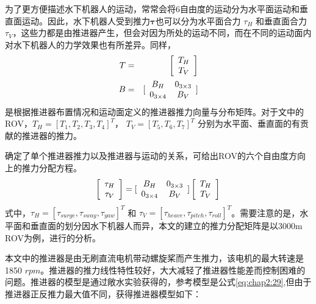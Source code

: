 为了更方便描述水下机器人的运动，常常会将6自由度的运动分为水平面运动和垂直面运动。因此，水下机器人受到推力$\bm \tau$也可以分为水平面合力 $\tau_H$ 和垂直面合力 $\tau_V$，这些力都是由推进器产生，但会对因为所处的运动不同，而在不同的运动面内对水下机器人的力学效果也有所差异。同样，\\
\begin{eqnarray}
\label{eq:chap2:BvBh}
\centering
T &=& \left[ {\begin{array}{*{20}{c}}
   {{T_H}}  \\
   {{T_V}}  \\
\end{array}} \right]\\
B &=& [\begin{array}{*{20}{c}}
    {{B_H}} & {0_{3\times3}}  \\
    {0_{3\times4}} & {{B_V}}  \\
\end{array}]
\end{eqnarray}
是根据推进器布置情况和运动面定义的推进器推力向量与分布矩阵。对于文中的ROV，$T_H = [T_1, T_2, T_3, T_4]^T$， $T_V = [T_5,T_6,T_7]^T$ 分别为水平面、垂直面的有贡献的推进器的推力。

确定了单个推进器推力以及推进器与运动的关系，可给出ROV的六个自由度方向上的推力分配方程。
\begin{equation}
\label{eq:chap2:thrustconfigure_2}
     \left[ \begin{array}{*{20}{c}}
     \tau_H\\
     \tau_V\\
     \end{array}\right]
      =
     [\begin{array}{*{20}{c}}
     {{B_H}} & {0_{3\times3}}  \\
     {0_{3\times4}} & {{B_V}}  \\
     \end{array}]\left[ {\begin{array}{*{20}{c}}
     {{T_H}}  \\
     {{T_V}}  \\
     \end{array}} \right] \\
\end{equation}
式中，$\tau_H = [\tau_{surge},\tau_{sway},\tau_{yaw}]^T$ 和 $\tau_V=[\tau_{heave},\tau_{pitch},\tau_{roll}]^T$。需要注意的是，水平面和垂直面的划分因水下机器人而异，本文的建立的推力分配矩阵是以3000m ROV为例，进行的分析。

本文中的推进器是由无刷直流电机带动螺旋桨而产生推力，该电机的最大转速是1850 $rpm$。推进器的推力线性特性较好，大大减轻了推进器性能差而控制困难的问题。推进器的模型是通过敞水实验获得的，参考模型是公式\ref{eq:chap2:29},但由于推进器正反推力最大值不同，获得推进器模型如下\cite{wunl2011immune}：

